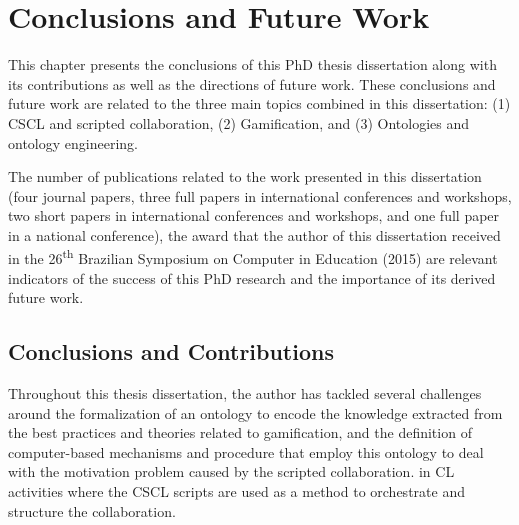\chapter{Conclusions and Future Work}
\label{chapter:conclusions} 

This chapter presents the conclusions of this PhD thesis dissertation along with its contributions as well as the directions of future work. 
These conclusions and future work are related to the three main topics combined in this dissertation: (1) CSCL and scripted collaboration, (2) Gamification, and (3) Ontologies and ontology engineering.

The number of publications related to the work presented in this dissertation (four journal papers, three full papers in international conferences and workshops, two short papers in international conferences and workshops, and one full paper in a national conference), the award that the author of this dissertation received in the 26\textsuperscript{th} Brazilian Symposium on Computer in Education (2015) are relevant indicators of the success of this PhD research and the importance of its derived future work.

\section{Conclusions and Contributions}
\label{sec:conclusions-contributions}

Throughout this thesis dissertation, the author has tackled several challenges around the formalization of an ontology to encode the knowledge extracted from the best practices and theories related to gamification, and the definition of computer-based mechanisms and procedure that employ this ontology to deal with the motivation problem caused by the scripted collaboration. in CL activities where the CSCL scripts are used as a method to orchestrate and structure the collaboration.

